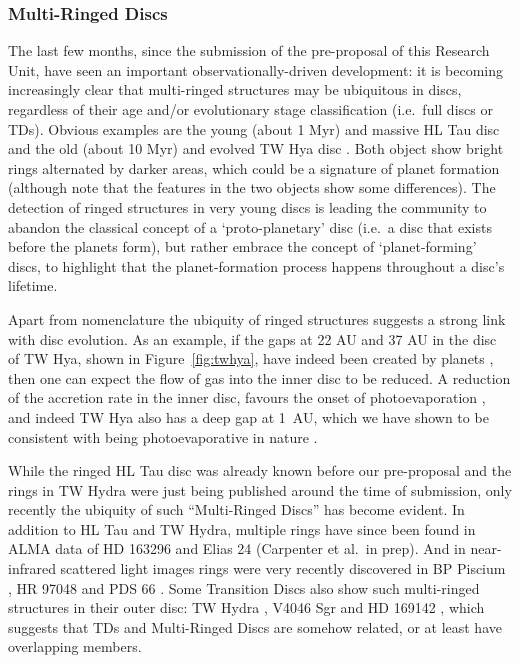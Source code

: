 \documentclass[10pt,fleqn,twoside]{article}
\begin{document}
\subsubsection{Multi-Ringed Discs}
\label{sec-multi-ringed-discs}
The last few months, since the submission of the pre-proposal of this
Research Unit, have seen an important observationally-driven development: it
is becoming increasingly clear that multi-ringed structures may be
ubiquitous in discs, regardless of their age and/or evolutionary stage
classification (i.e.\ full discs or TDs). Obvious examples are the young
(about 1 Myr) and massive HL Tau disc \citep{2015ApJ...808L...3A} and the
old (about 10 Myr) and evolved TW Hya disc \citep{2016ApJ...820L..40A,
  2016arXiv161008939V}. Both object show bright rings alternated by darker
areas, which could be a signature of planet formation (although note that
the features in the two objects show some differences). The detection of
ringed structures in very young discs is leading the community to abandon
the classical concept of a `proto-planetary' disc (i.e.\ a disc that exists
before the planets form), but rather embrace the concept of `planet-forming'
discs, to highlight that the planet-formation process happens throughout a
disc's lifetime.

Apart from nomenclature the ubiquity of ringed structures suggests a strong
link with disc evolution. As an example, if the gaps at 22 AU and 37 AU in
the disc of TW Hya, shown in Figure~\ref{fig:twhya}, have indeed been
created by planets \citep[but see also][]{2016arXiv161008939V}, then one can
expect the flow of gas into the inner disc to be reduced. A reduction of the
accretion rate in the inner disc, favours the onset of photoevaporation
\citep[e.g.][]{2013MNRAS.430.1392R, 2015MNRAS.454.2173R}, and indeed TW Hya
also has a deep gap at 1~AU, which we have shown to be consistent with being
photoevaporative in nature \citep{2017MNRAS.464L..95E}.

While the ringed HL Tau disc was already known before our pre-proposal and
the rings in TW Hydra were just being published around the time of
submission, only recently the ubiquity of such ``Multi-Ringed Discs'' has
become evident. In addition to HL Tau and TW Hydra, multiple rings have
since been found in ALMA data of HD 163296 \citep{Isella2016} and Elias 24
(Carpenter et al.~in prep). And in near-infrared scattered light images
rings were very recently discovered in BP Piscium
\citep{2017MNRAS.466L...7D}, HR 97048 \citep{2016A&A...595A.112G} and PDS 66
\citep{2016ApJ...818L..15W}. Some Transition Discs also show such
multi-ringed structures in their outer disc: TW Hydra
\citep{2016arXiv161008939V}, V4046 Sgr \citep{2015ApJ...803L..10R} and HD
169142 \citep{2015PASJ...67...83M}, which suggests that TDs and Multi-Ringed
Discs are somehow related, or at least have overlapping members.
\end{document}
